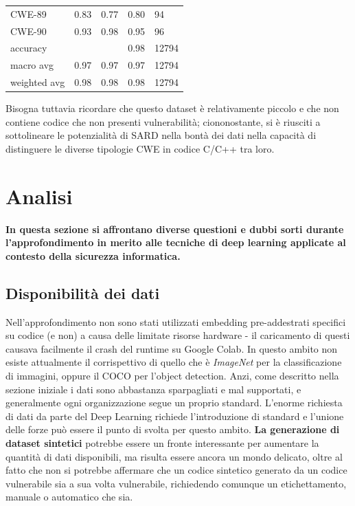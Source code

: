 \documentclass[conference]{IEEEtran}
\begin{document}
\begin{table}[h]
\begin{tabular}{lllll}
CWE-89       & 0.83               & 0.77            & 0.80              & 94              \\
CWE-90       & 0.93               & 0.98            & 0.95              & 96              \\
accuracy     &                    &                 & 0.98              & 12794           \\
macro avg    & 0.97               & 0.97            & 0.97              & 12794           \\
weighted avg & 0.98               & 0.98            & 0.98              & 12794          
\end{tabular}
\end{table}

Bisogna tuttavia ricordare che questo dataset è relativamente piccolo e che non contiene codice che non presenti vulnerabilità; ciononostante, si è riusciti a sottolineare le potenzialità di SARD nella bontà dei dati nella capacità di distinguere le diverse tipologie CWE in codice C/C++ tra loro.

\section{Analisi}

\textbf{In questa sezione si affrontano diverse questioni e dubbi sorti durante l'approfondimento in merito alle tecniche di deep learning applicate al contesto della sicurezza informatica.}

\subsection{Disponibilità dei dati}
Nell'approfondimento non sono stati utilizzati embedding pre-addestrati specifici su codice (e non) a causa delle limitate risorse hardware - il caricamento di questi causava facilmente il crash del runtime su Google Colab. In questo ambito non esiste attualmente il corrispettivo di quello che è \textit{ImageNet} per la classificazione di immagini, oppure il COCO per l'object detection. Anzi, come descritto nella sezione iniziale i dati sono abbastanza sparpagliati e mal supportati, e generalmente ogni organizzazione segue un proprio standard. L'enorme richiesta di dati da parte del Deep Learning richiede l'introduzione di standard e l'unione delle forze può essere il punto di svolta per questo ambito.
\textbf{La generazione di dataset sintetici} potrebbe essere un fronte interessante per aumentare la quantità di dati disponibili, ma risulta essere ancora un mondo delicato, oltre al fatto che non si potrebbe affermare che un codice sintetico generato da un codice vulnerabile sia a sua volta vulnerabile, richiedendo comunque un etichettamento, manuale o automatico che sia.
\end{document}
